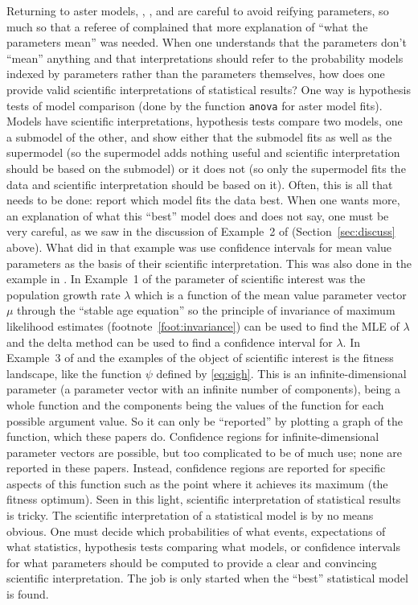 \documentclass[11pt]{article}
\begin{document}
Returning to aster models, \citet{gws}, \citet{aster2}, and \citet{aster3}
are careful to avoid reifying parameters, so much so that
a referee of \citet{aster3} complained that more explanation of ``what the
parameters mean'' was needed.  When one understands that the parameters
don't ``mean'' anything and that interpretations should refer to the
probability models indexed by parameters rather than the parameters themselves,
how does one provide valid scientific interpretations of statistical results?
One way is hypothesis tests of model comparison (done by the function
\texttt{anova} for aster model fits).  Models have scientific interpretations,
hypothesis tests compare two models, one a submodel of the other, and show
either that the submodel fits as well as the supermodel (so the supermodel
adds nothing useful and scientific interpretation should be based on the
submodel) or it does not (so only the supermodel fits the data and scientific
interpretation should be based on it).  Often, this is all that needs to be
done: report which model fits the data best.  When one wants more, an
explanation of what this ``best'' model does and does not say, one must
be very careful, as we saw in the discussion of Example~2 of \citet{aster2}
(Section~\ref{sec:discuss} above).  What \citet{aster2} did in that example
was use confidence intervals for mean value parameters as the basis of
their scientific interpretation.  This was also done in the example in
\citet{gws}.  In Example~1 of \citet{aster2} the parameter of scientific
interest was the population growth rate $\lambda$ which is a function of
the mean value parameter vector $\mu$ through the ``stable age equation''
so the principle of invariance of maximum likelihood estimates
(footnote~\ref{foot:invariance}) can be used to find the MLE of $\lambda$
and the delta method can be used to find a confidence interval for $\lambda$.
In Example~3 of \citet{aster2} and the examples of \citet{aster3} the object
of scientific interest is the fitness landscape, like the function $\psi$
defined by \eqref{eq:sigh}.  This is an infinite-dimensional parameter
(a parameter vector with an infinite number of components),
being a whole function and the components
being the values of the function for each possible argument value.
So it can
only be ``reported'' by plotting a graph of the function, which these papers
do.  Confidence regions for infinite-dimensional parameter vectors are
possible, but too complicated to be of much use; none are reported in these
papers.  Instead, confidence regions are reported for specific aspects of
this function such as the point where it achieves its maximum (the fitness
optimum).  Seen in this light, scientific interpretation of
statistical results is tricky.  The scientific interpretation of a statistical
model is by no means obvious.  One must decide which probabilities of what
events,
expectations of what statistics, hypothesis tests comparing what models,
or confidence intervals for what parameters should be computed to provide
a clear and convincing scientific interpretation.  The job is only started
when the ``best'' statistical model is found.
\end{document}
